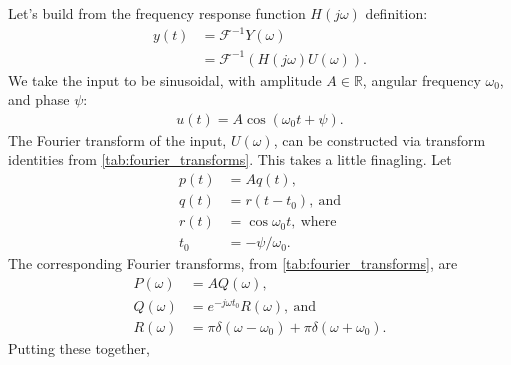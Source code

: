 \documentclass[dynamic_systems.tex]{subfiles}
\begin{document}
Let's build from the frequency response function $H(j\omega)$ definition:
\begin{subequations}
\begin{align}
	y(t) &= \mathcal{F}^{-1}Y(\omega) \\
	&= \mathcal{F}^{-1}(H(j\omega)U(\omega)).
	\label{eq:sinusoidal_response_sol_01}
\end{align}
\end{subequations}
We take the input to be sinusoidal, with amplitude $A\in\mathbb{R}$, angular frequency $\omega_0$, and phase $\psi$:
\begin{align}
	u(t) = A \cos(\omega_0 t + \psi).
\end{align}
The Fourier transform of the input, $U(\omega)$, can be constructed via transform identities from \cref{tab:fourier_transforms}.
This takes a little finagling.
Let
\begin{subequations}
\begin{align}
	p(t) &= A q(t), \\
	q(t) &= r(t - t_0),\ \text{and} \\
	r(t) &= \cos\omega_0 t,\ \text{where} \\
	t_0 &= -\psi/\omega_0.
\end{align}
\end{subequations}
The corresponding Fourier transforms, from \cref{tab:fourier_transforms}, are 
\begin{subequations}
\begin{align}
	P(\omega) &= A Q(\omega), \\
	Q(\omega) &= e^{-j\omega t_0} R(\omega),\ \text{and} \\
	R(\omega) &= \pi \delta(\omega-\omega_0) + \pi \delta(\omega+\omega_0).
\end{align}
\end{subequations}
Putting these together,
\end{document}

